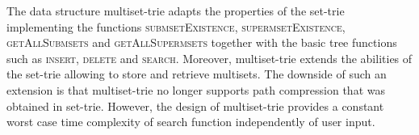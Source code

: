 The data structure multiset-trie adapts the properties of the set-trie implementing 
the functions \textsc{submsetExistence}, \textsc{supermsetExistence}, 
\textsc{getAllSubmsets} and \textsc{getAllSupermsets} together with the basic 
tree functions such as \textsc{insert}, \textsc{delete} and \textsc{search}. 
Moreover, multiset-trie extends the abilities of the set-trie allowing to store and 
retrieve multisets. The downside of such an extension is that multiset-trie no 
longer supports path compression that was obtained in set-trie. However, the 
design of multiset-trie provides a constant worst case time complexity of search 
function independently of user input. 






